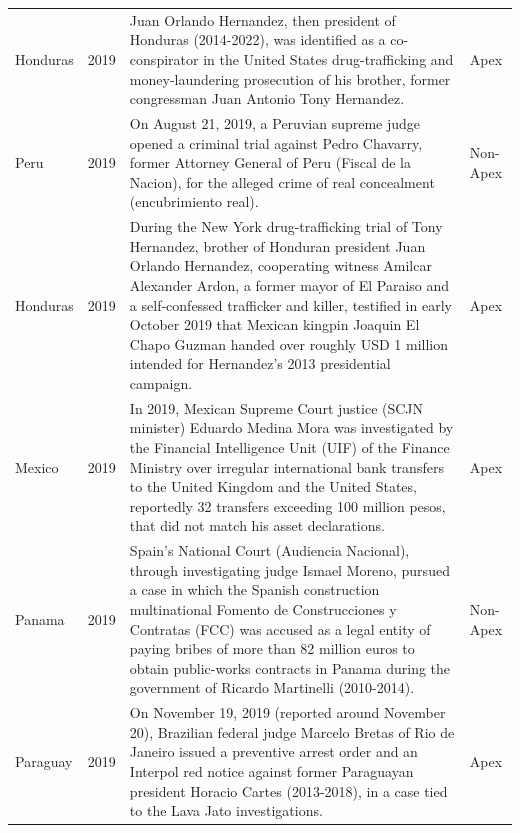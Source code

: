 \begin{landscape}
\begin{longtable}{@{}l c p{15.5cm} l@{}}
Honduras & 2019 & Juan Orlando Hernandez, then president of Honduras (2014-2022), was identified as a co-conspirator in the United States drug-trafficking and money-laundering prosecution of his brother, former congressman Juan Antonio Tony Hernandez. & Apex \\
Peru & 2019 & On August 21, 2019, a Peruvian supreme judge opened a criminal trial against Pedro Chavarry, former Attorney General of Peru (Fiscal de la Nacion), for the alleged crime of real concealment (encubrimiento real). & Non-Apex \\
Honduras & 2019 & During the New York drug-trafficking trial of Tony Hernandez, brother of Honduran president Juan Orlando Hernandez, cooperating witness Amilcar Alexander Ardon, a former mayor of El Paraiso and a self-confessed trafficker and killer, testified in early October 2019 that Mexican kingpin Joaquin El Chapo Guzman handed over roughly USD 1 million intended for Hernandez's 2013 presidential campaign. & Apex \\
Mexico & 2019 & In 2019, Mexican Supreme Court justice (SCJN minister) Eduardo Medina Mora was investigated by the Financial Intelligence Unit (UIF) of the Finance Ministry over irregular international bank transfers to the United Kingdom and the United States, reportedly 32 transfers exceeding 100 million pesos, that did not match his asset declarations. & Apex \\
Panama & 2019 & Spain's National Court (Audiencia Nacional), through investigating judge Ismael Moreno, pursued a case in which the Spanish construction multinational Fomento de Construcciones y Contratas (FCC) was accused as a legal entity of paying bribes of more than 82 million euros to obtain public-works contracts in Panama during the government of Ricardo Martinelli (2010-2014). & Non-Apex \\
Paraguay & 2019 & On November 19, 2019 (reported around November 20), Brazilian federal judge Marcelo Bretas of Rio de Janeiro issued a preventive arrest order and an Interpol red notice against former Paraguayan president Horacio Cartes (2013-2018), in a case tied to the Lava Jato investigations. & Apex \\
\end{longtable}
\endgroup
\end{landscape}
